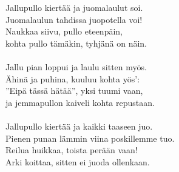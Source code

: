 
            Jallupullo kiertää ja juomalaulut soi. \\
            Juomalaulun tahdissa juopotella voi! \\
            Naukkaa siivu, pullo eteenpäin, \\
            kohta pullo tämäkin, tyhjänä on näin. \\
\hspace{10mm} \\
            Jallu pian loppui ja laulu sitten myös. \\
            Ähinä ja puhina, kuuluu kohta yös': \\
            ”Eipä tässä hätää”, yksi tuumi vaan, \\
            ja jemmapullon kaiveli kohta repustaan. \\
\hspace{10mm} \\
            Jallupullo kiertää ja kaikki taaseen juo. \\
            Pienen punan lämmin viina poskillemme tuo. \\
            Reilua huikkaa, toista perään vaan! \\
            Arki koittaa, sitten ei juoda ollenkaan. \\

